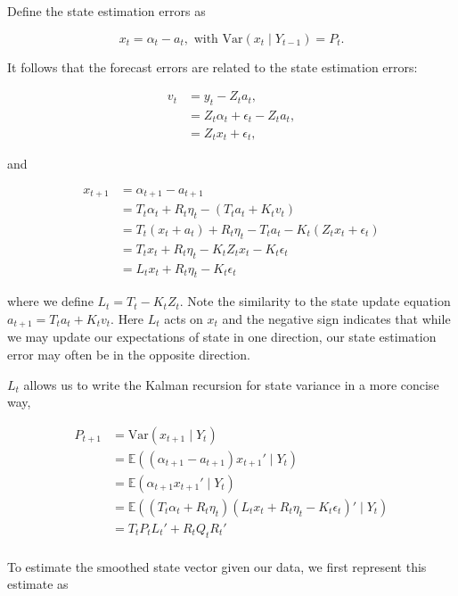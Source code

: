 \documentclass{tufte-book}
\begin{document}
Define the state estimation errors as

\[
x_t = \alpha_t - a_t, \text{ with } \text{Var}(x_t \mid Y_{t-1}) = P_t.
\]

\noindent It follows that the forecast errors are related to the state estimation errors:

\begin{align*}
v_t &= y_t - Z_t a_t, \\
&= Z_t \alpha_t + \epsilon_t - Z_t a_t, \\
&= Z_t x_t + \epsilon_t,
\end{align*}

\noindent and

\begin{align*}
x_{t+1} &= \alpha_{t+1} - a_{t+1} \\
&= T_t \alpha_t + R_t \eta_t - (T_t a_t + K_t v_t) \\
&= T_t (x_t + a_t) + R_t \eta_t - T_t a_t - K_t (Z_t x_t + \epsilon_t)\\
&= T_t x_t + R_t \eta_t - K_t Z_t x_t - K_t \epsilon_t \\
&= L_t x_t + R_t \eta_t - K_t \epsilon_t 
\end{align*}

\noindent where we define $L_t = T_t - K_t Z_t$. Note the similarity to the state update equation $a_{t+1} = T_t a_t + K_t v_t$. Here $L_t$ acts on $x_t$ and the negative sign indicates that while we may update our expectations of state in one direction, our state estimation error may often be in the opposite direction.

$L_t$ allows us to write the Kalman recursion for state variance in a more concise way,

\begin{align}
P_{t+1} &= \text{Var}(x_{t+1} \mid Y_t) \nonumber \\
&= \mathbb{E}((\alpha_{t+1} - a_{t+1}) x_{t+1}' \mid Y_t) \nonumber \\
&= \mathbb{E}(\alpha_{t+1} x_{t+1}' \mid Y_t) \nonumber \\
&= \mathbb{E}((T_t \alpha_t + R_t \eta_t) (L_t x_t + R_t \eta_t - K_t \epsilon_t)' \mid Y_t) \nonumber \\
&= T_t P_t L_t' + R_t Q_t R_t' \label{eq:kal-var-update-simple} \\
\end{align}

To estimate the smoothed state vector given our data, we first represent this estimate as
\end{document}
